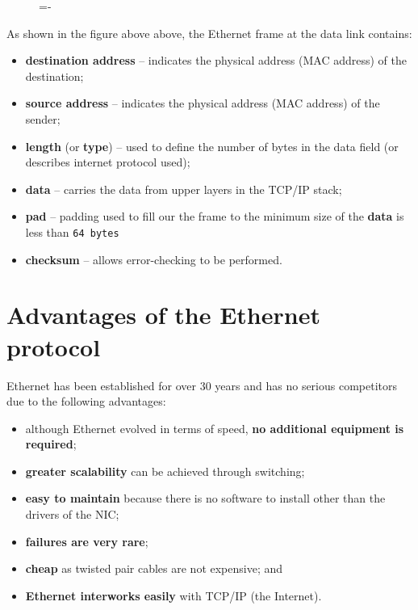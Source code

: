 \documentclass[a4paper]{systems-software}
\begin{document}
\begin{figure}[H]
	\lineskip=-\fboxrule
\end{figure}

As shown in the figure above above, the Ethernet frame at the data link contains:
\begin{itemize}
	\item \textbf{destination address} -- indicates the physical address (MAC address) of the destination;
	\item \textbf{source address} -- indicates the physical address (MAC address) of the sender;
	\item \textbf{length} (or \textbf{type}) -- used to define the number of bytes in the data field (or describes internet protocol used);
	\item \textbf{data} -- carries the data from upper layers in the TCP/IP stack;
	\item \textbf{pad} -- padding used to fill our the frame to the minimum size of the \textbf{data} is less than \texttt{64 bytes}
	\item \textbf{checksum} -- allows error-checking to be performed.
\end{itemize}


\section{Advantages of the Ethernet protocol}

Ethernet has been established for over 30 years and has no serious competitors due to the following advantages:
\begin{itemize}
	\item although Ethernet evolved in terms of speed, \textbf{no additional equipment is required};
	\item \textbf{greater scalability} can be achieved through switching;
	\item \textbf{easy to maintain} because there is no software to install other than the drivers of the NIC;
	\item \textbf{failures are very rare};
	\item \textbf{cheap} as twisted pair cables are not expensive; and
	\item \textbf{Ethernet interworks easily} with TCP/IP (the Internet).
\end{itemize}
\end{document}

